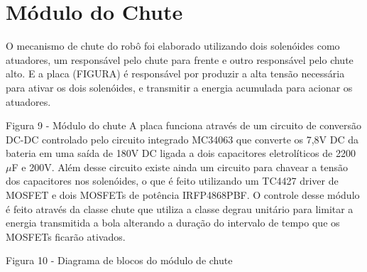 \section{Módulo do Chute}\label{sec:modulo_chute}

O mecanismo de chute do robô foi elaborado utilizando dois solenóides como atuadores, um responsável pelo chute para frente e outro responsável pelo chute alto. E a placa (FIGURA) é responsável por produzir a alta tensão necessária para ativar os dois solenóides, e transmitir a energia acumulada para acionar os atuadores.


Figura 9 - Módulo do chute
A placa funciona através de um circuito de conversão DC-DC controlado pelo circuito integrado MC34063 que converte os 7,8V DC da bateria em uma saída de 180V DC ligada a dois capacitores eletrolíticos de 2200 $\mu$F e 200V. Além desse circuito existe ainda um circuito para chavear a tensão dos capacitores nos solenóides, o que é feito utilizando um TC4427 driver de MOSFET e dois MOSFETs de potência IRFP4868PBF. 
O controle desse módulo é feito através da classe chute que utiliza a classe degrau unitário para limitar a energia transmitida a bola alterando a duração do intervalo de tempo que os MOSFETs ficarão ativados.

Figura 10 - Diagrama de blocos do módulo de chute



